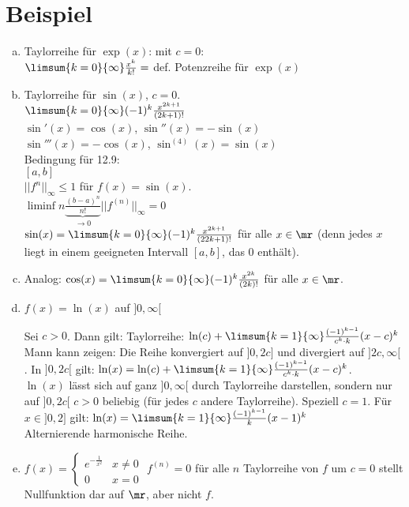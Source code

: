 \section{Beispiel}
	\begin{enumerate}[a)]
	\item  Taylorreihe für $ \exp(x) $: mit $ c=0 $:\\
	$ \limsum{k=0}{\infty}\frac{x^k}{k!}= $ def. Potenzreihe für $ \exp(x) $
	\item  Taylorreihe für $ \sin(x) $, $ c=0 $.\\
	$ \limsum{k=0}{\infty}(-1)^k\frac{x^{2k+1}}{(2k+1)!} $\\
	$ \sin'(x)=\cos(x) $, $ \sin''(x)=-\sin(x) $\\
	$ \sin'''(x)=-\cos(x) $, $ \sin^{(4)}(x)=\sin(x) $\\
	Bedingung für 12.9:\\
	$ [a,b] $\\
	$ ||f^n||_\infty\leq 1 $ für $ f(x)=\sin(x) $.\\
	$ \liminf{n}\underbrace{\frac{(b-a)^n}{n!}}_{\rightarrow 0}||f^{(n)}||_\infty=0 $\\
	$ \sin(x)=\limsum{k=0}{\infty}(-1)^k\frac{x^{2k+1}}{(22k+1)!} $ für alle $ x\in\mr $ (denn jedes $ x $ liegt in einem geeigneten Intervall $ [a,b] $, das 0 enthält).
	\item Analog: $ \cos(x)=\limsum{k=0}{\infty}(-1)^k\frac{x^{2k}}{(2k)!} $ für alle $ x\in\mr $.
	\item $ f(x)=\ln(x) $ auf $ ]0,\infty[ $
	
	Sei $ c>0 $. Dann gilt:
	Taylorreihe: $ \ln(c)+\limsum{k=1}{\infty}\frac{(-1)^{k-1}}{c^k\cdot k}(x-c)^k $\\
	Mann kann zeigen: Die Reihe konvergiert auf $ ]0,2c] $ und divergiert auf $ ]2c,\infty[ $. In $ ]0,2c[ $ gilt: $ \ln(x)=\ln(c)+\limsum{k=1}{\infty}\frac{(-1)^{k-1}}{c^k\cdot k}(x-c)^k $.\\
	$ \ln(x) $ lässt sich auf ganz $ ]0,\infty[ $ durch Taylorreihe darstellen, sondern nur auf $ ]0,2c[ $ $ c>0 $ beliebig (für jedes $ c $ andere Taylorreihe). Speziell $ c=1 $. Für $ x\in]0,2] $ gilt: $ \ln(x)=\limsum{k=1}{\infty}\frac{(-1)^{k-1}}{k}(x-1)^k $\\
	Alternierende harmonische Reihe.
	\item  $ f(x)=\begin{cases}e^{-\frac{1}{x^2}}&x\neq 0\\0&x=0\end{cases} $
	$ f^{(n)}=0 $ für alle $ n $ Taylorreihe von $ f $ um $ c=0 $ stellt Nullfunktion dar auf $ \mr $, aber nicht $ f $.
	\end{enumerate}
